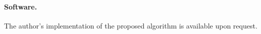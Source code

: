 \documentclass{article}
\begin{document}
\paragraph{Software.} The author's implementation of the proposed
algorithm is available upon request.










\end{document}
